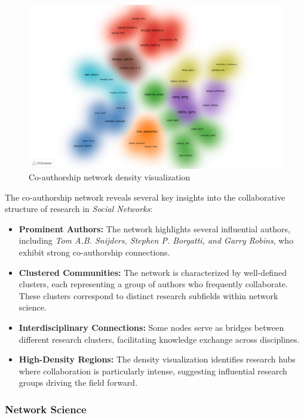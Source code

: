 \documentclass[twocolumn]{article}
\begin{document}
		\begin{figure}[htbp]
			\centering
			\includegraphics[width=\columnwidth]{Social Networks/WOS data/VOS/co-authorship-density.pdf}
			\caption{Co-authorship network density visualization}
			\label{fig.fig14}
		\end{figure}
		
		The co-authorship network reveals several key insights into the collaborative structure of research in \textit{Social Networks}:
		
		\begin{itemize}
			\item \textbf{Prominent Authors:} The network highlights several influential authors, including \textit{Tom A.B. Snijders, Stephen P. Borgatti, and Garry Robins}, who exhibit strong co-authorship connections.
			\item \textbf{Clustered Communities:} The network is characterized by well-defined clusters, each representing a group of authors who frequently collaborate. These clusters correspond to distinct research subfields within network science.
			\item \textbf{Interdisciplinary Connections:} Some nodes serve as bridges between different research clusters, facilitating knowledge exchange across disciplines.
			\item \textbf{High-Density Regions:} The density visualization identifies research hubs where collaboration is particularly intense, suggesting influential research groups driving the field forward.
		\end{itemize}
		
		\subsubsection*{Network Science}
		
\end{document}
